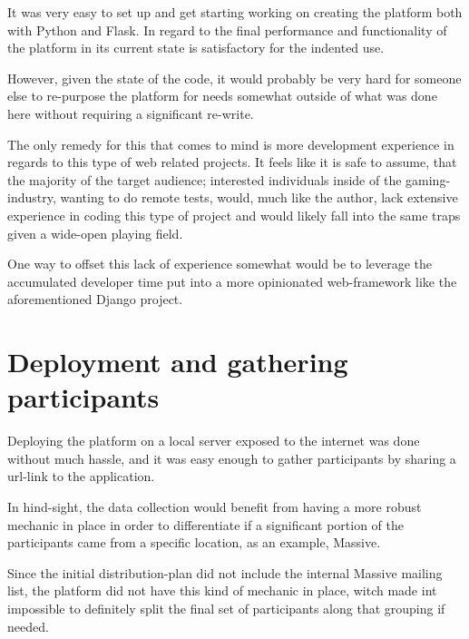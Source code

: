   It was very easy to set up and get starting working on creating the platform
  both with Python and Flask. In regard to the final performance and
  functionality of the platform in its current state is satisfactory for the
  indented use.

  However, given the state of the code, it would probably be very hard for
  someone else to re-purpose the platform for needs somewhat outside of what
  was done here without requiring a significant re-write.

  The only remedy for this that comes to mind is more development experience in
  regards to this type of web related projects. It feels like it is safe to
  assume, that the majority of the target audience; interested individuals
  inside of the gaming-industry, wanting to do remote tests, would, much like
  the author, lack extensive experience in coding this type of project and
  would likely fall into the same traps given a wide-open playing field.

  One way to offset this lack of experience somewhat would be to leverage the
  accumulated developer time put into a more opinionated web-framework like the
  aforementioned Django\cite{citeDjangoHomepage} project.



\section{Deployment and gathering participants}

  Deploying the platform on a local server exposed to the internet was done
  without much hassle, and it was easy enough to gather participants by
  sharing a url-link to the application.

  In hind-sight, the data collection would benefit from having a more robust
  mechanic in place in order to differentiate if a significant portion of the
  participants came from a specific location, as an example, Massive.

  Since the initial distribution-plan did not include the internal Massive
  mailing list, the platform did not have this kind of mechanic in place, witch
  made int impossible to definitely split the final set of participants along
  that grouping if needed.


